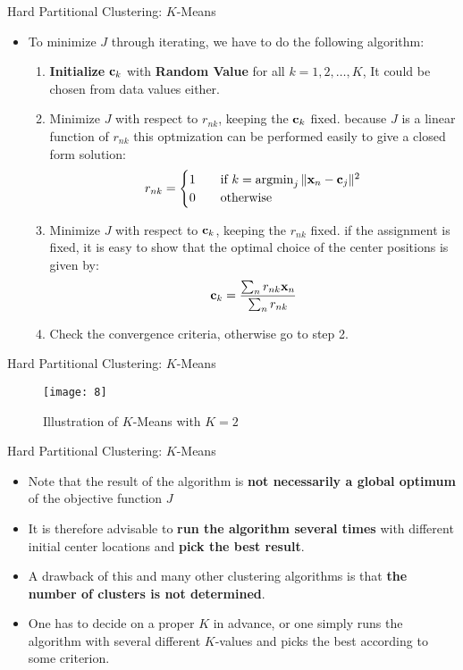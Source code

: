\documentclass[compress,oilve]{beamer}
\DeclareMathOperator*{\argmin}{argmin}
\begin{document}
\begin{frame}{Hard Partitional Clustering: $K$-Means}
\begin{itemize}
\item To minimize $ J $ through iterating, we have to do the following algorithm:
	\begin{enumerate}
		\item \textbf{Initialize} $ \mathbf{c_{\mathnormal k}} $ with \textbf{Random Value} for all $ k = 1, 2, \dots, K$, It could be chosen from data values either.
		\item Minimize $ J $ with respect to $ r_{nk} $, keeping the $ \mathbf{c_{\mathnormal k}} $ fixed. because $ J $ is a linear function of $ r_{nk} $ this optmization can be performed easily to give a closed form solution:
				$$ r_{nk} = \begin{cases}
    1      & \quad \text{if } k =  \argmin_{j} \| \mathbf{x_{\mathnormal n}} -  \mathbf{c_{\mathnormal j}} \| ^ {2}\\
   0  & \quad \text{otherwise}
  \end{cases} $$
		\item Minimize $ J $ with respect to $ \mathbf{c_{\mathnormal k}} $, keeping the $ r_{nk} $ fixed. if the assignment is fixed, it is easy to show that the optimal choice of the center positions is given by:
			$$ \mathbf{c_{\mathnormal k}} =  \frac{\sum_{n} r_{nk}\mathbf x_{\mathnormal n}}{\sum_{n} r_{nk}}$$
		\item Check the convergence criteria, otherwise go to step 2.	
	\end{enumerate}
\end{itemize}
\end{frame}

\begin{frame}{Hard Partitional Clustering: $K$-Means}
\begin{figure}
	\centering
	\texttt{[image: 8]}
	\caption{Illustration of $K$-Means with $K = 2$}
\end{figure}
\end{frame}

\begin{frame}{Hard Partitional Clustering: $K$-Means}
\begin{itemize}
\item Note that the result of the algorithm is \textbf{not necessarily a global optimum} of the objective function $ J $
\item It is therefore advisable to \textbf{run the algorithm several times} with different initial center locations and \textbf{pick the best result}.
\item A drawback of this and many other clustering algorithms is that \textbf{the number of clusters is not determined}.
\item One has to decide on a proper $K$ in advance, or one simply runs the algorithm with several different $K$-values and picks the best according to some criterion.
\end{itemize}
\end{frame}
\end{document}
